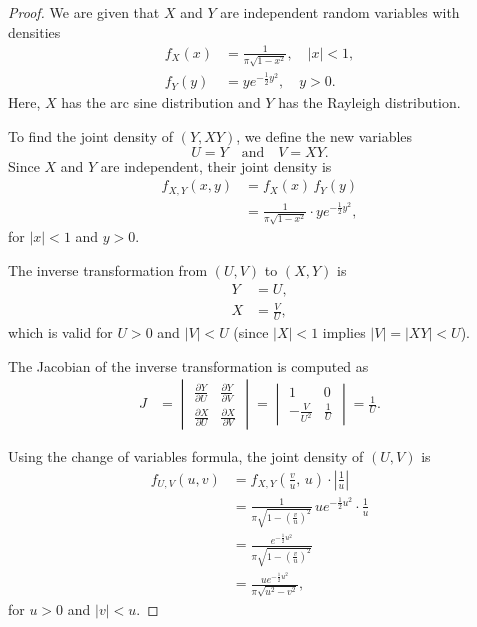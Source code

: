 \documentclass[letterpaper, 11pt]{article}
\newcommand{\1}{\mathds{1}}	%
\theoremstyle{definition}
\begin{document}
\begin{proof}
We are given that \(X\) and \(Y\) are independent random variables with densities
\begin{align*}
f_X(x) &= \frac{1}{\pi\sqrt{1-x^2}}, \quad |x|<1, \\
f_Y(y) &= ye^{-\frac{1}{2}y^2}, \quad y>0.
\end{align*}
Here, \(X\) has the arc sine distribution and \(Y\) has the Rayleigh distribution.

To find the joint density of \((Y, XY)\), we define the new variables
\[
U = Y \quad \text{and} \quad V = XY.
\]
Since \(X\) and \(Y\) are independent, their joint density is
\begin{align*}
f_{X,Y}(x,y) &= f_X(x) \, f_Y(y) \\
&= \frac{1}{\pi\sqrt{1-x^2}} \cdot ye^{-\frac{1}{2}y^2},
\end{align*}
for \(|x|<1\) and \(y>0\).

The inverse transformation from \((U,V)\) to \((X,Y)\) is
\begin{align*}
Y &= U, \\
X &= \frac{V}{U},
\end{align*}
which is valid for \(U>0\) and \(|V|<U\) (since \(|X|<1\) implies \(|V| = |XY| < U\)).

The Jacobian of the inverse transformation is computed as
\begin{align*}
J &= \begin{vmatrix}
\frac{\partial Y}{\partial U} & \frac{\partial Y}{\partial V} \\[2mm]
\frac{\partial X}{\partial U} & \frac{\partial X}{\partial V}
\end{vmatrix}
= \begin{vmatrix}
1 & 0 \\[2mm]
-\frac{V}{U^2} & \frac{1}{U}
\end{vmatrix}
= \frac{1}{U}.
\end{align*}

Using the change of variables formula, the joint density of \((U,V)\) is
\begin{align*}
f_{U,V}(u,v) &= f_{X,Y}\left(\frac{v}{u},\, u\right) \cdot \left|\frac{1}{u}\right| \\
&= \frac{1}{\pi\sqrt{1-\left(\frac{v}{u}\right)^2}} \, u e^{-\frac{1}{2}u^2} \cdot \frac{1}{u} \\
&= \frac{e^{-\frac{1}{2}u^2}}{\pi\sqrt{1-\left(\frac{v}{u}\right)^2}} \\
&= \frac{u e^{-\frac{1}{2}u^2}}{\pi\sqrt{u^2-v^2}},
\end{align*}
for \(u>0\) and \(|v|<u\).


\end{proof}
\end{document}

